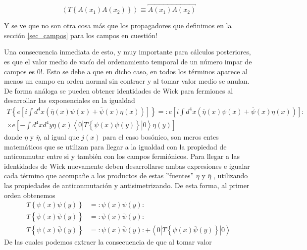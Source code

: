 \documentclass{article}
\numberwithin{equation}{section}
\begin{document}
\begin{equation}\label{key}
\left\langle T\left\{ A(x_{1})A(x_{2})\right\} \right\rangle \equiv \overbracket{A(x_{1})A(x_{2})}
\end{equation}

Y se ve que no son otra cosa más que los propagadores que definimos en la sección \ref{sec_campos} para los campos en cuestión!

Una consecuencia inmediata de esto, y muy importante para cálculos posteriores, es que el valor
medio de vacío del ordenamiento temporal de un número impar de campos
es 0!. Esto se debe a que en dicho caso, en todos los términos aparece
al menos un campo en orden normal sin contraer y al tomar valor medio
se anulan.\\

De forma análoga se pueden obtener identidades de Wick
para fermiones al desarrollar las exponenciales en la igualdad
\begin{equation}\label{wickfer}
\begin{aligned}
T\left\{ e\left[i\int d^{4}x\left(\overline{\eta}(x)\psi(x)+\overline{\psi}(x)\eta(x)\right)\right]\right\} =:e\left[i\int d^{4}x\left(\overline{\eta}(x)\psi(x)+\overline{\psi}(x)\eta(x)\right)\right]:\\
\times e\left[-\int d^{4}xd^{4}y\overline{\eta}(x)\left\langle 0|T\left\{ \psi(x)\overline{\psi}(y)\right\} |0\right\rangle \eta(y)\right]
\end{aligned}
\end{equation}
donde $\eta$ y $\overline{\eta}$, al igual que $ j(x) $ para el caso bosónico, son meros entes matemáticos que
se utilizan para llegar a la igualdad con la propiedad de anticonmutar
entre si y también con los campos fermiónicos. Para llegar a las identidades
de Wick nuevamente deben desarrollarse ambas expresiones e igualar
cada término que acompañe a los productos de estas ''fuentes'' $\eta$
y $\overline{\eta}$ , utilizando las propiedades de anticonmutación
y antisimetrizando. De esta forma, al primer orden obtenemos
\begin{align}
T\left\{ \psi(x)\psi(y)\right\}  & =:\psi(x)\psi(y):\\
T\left\{ \overline{\psi}(x)\overline{\psi}(y)\right\}  & =:\overline{\psi}(x)\overline{\psi}(y):\\
T\left\{ \psi(x)\overline{\psi}(y)\right\}  & =:\psi(x)\overline{\psi}(y):+\left\langle 0|T\left\{ \psi(x)\overline{\psi}(y)\right\} |0\right\rangle 
\end{align}
De las cuales podemos extraer la consecuencia de que al tomar valor
\end{document}
